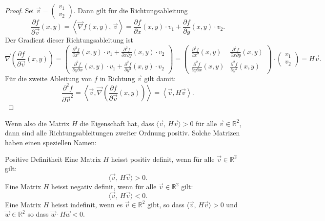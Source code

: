 \begin{proof}


	Sei \(\vec{v} = \begin{pmatrix} v_1 \\ v_2 \end{pmatrix}\). Dann gilt für die Richtungsableitung
	\[
		\frac{\partial f}{\partial \vec{v}}(x, y) = \left\langle \vec\nabla f(x,y) ,\, \vec{v} \right\rangle= \frac{\partial f}{\partial x}(x,y) \cdot v_1 + \frac{\partial f}{\partial y}(x,y) \cdot v_2.
	\]
	Der Gradient dieser Richtungsableitung ist
	\[
		\vec\nabla\left(\frac{\partial f}{\partial \vec{v}}(x, y)\right) =
		\begin{pmatrix}
			\frac{\partial^2 f}{\partial x^2}(x,y) \cdot v_1 + \frac{\partial^2 f}{\partial x \partial y}(x,y) \cdot v_2 \\
			\frac{\partial^2 f}{\partial y \partial x}(x,y) \cdot v_1 + \frac{\partial^2 f}{\partial y^2}(x,y) \cdot v_2
		\end{pmatrix}
		=
		\begin{pmatrix}
			\frac{\partial^2 f}{\partial x^2}(x,y)          & \frac{\partial^2 f}{\partial x \partial y}(x,y) \\
			\frac{\partial^2 f}{\partial y \partial x}(x,y) & \frac{\partial^2 f}{\partial y^2}(x,y)
		\end{pmatrix}
		\cdot
		\begin{pmatrix}
			v_1 \\ v_2
		\end{pmatrix}
		= H \vec{v}.
	\]
	Für die zweite Ableitung von \(f\) in Richtung \(\vec{v}\) gilt damit:
	\[
		\frac{\partial^2 f}{\partial \vec{v}^2}  = \left\langle \vec{v} , \vec\nabla\left(\frac{\partial f}{\partial \vec{v}}(x, y)\right) \right\rangle = \left\langle \vec{v} , H \vec{v} \right\rangle.
	\]

\end{proof}

Wenn also die Matrix \(H\) die Eigenschaft hat, dass \(\langle \vec{v} ,\, H \vec{v} \rangle > 0\) für alle \(\vec{v} \in \mathbb{R}^2\), dann sind alle Richtungsableitungen zweiter Ordnung positiv. Solche Matrizen haben einen speziellen Namen:

\begin{definition}
	{Positive Definitheit}{}
	Eine Matrix \(H\) heisst positiv definit, wenn für alle \(\vec{v} \in \mathbb{R}^2\) gilt:
	\[
		\langle \vec{v} ,\, H \vec{v} \rangle > 0.
	\]
	Eine Matrix \(H\) heisst negativ definit, wenn für alle \(\vec{v} \in \mathbb{R}^2\) gilt:
	\[
		\langle \vec{v} ,\, H \vec{v} \rangle < 0.
	\]
	Eine Matrix \(H\) heisst indefinit, wenn es \(\vec{v} \in \mathbb{R}^2\) gibt, so dass \(\langle \vec{v} ,\, H \vec{v} \rangle > 0\) und \(\vec{w} \in \mathbb{R}^2\) so dass \(\vec{w} \cdot H \vec{w} < 0\).

\end{definition}

